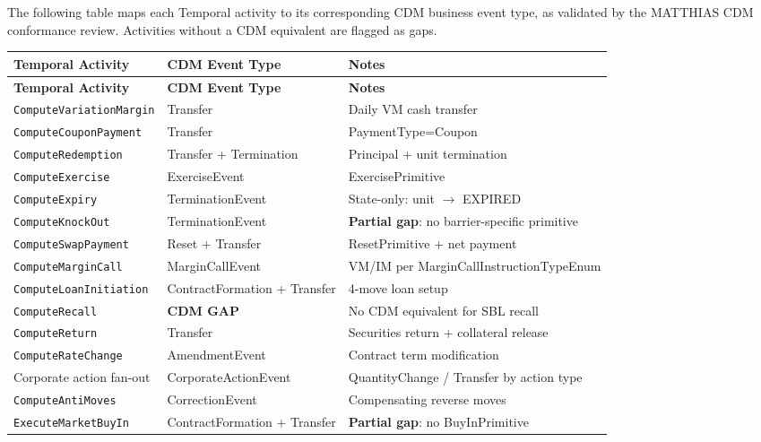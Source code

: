 \documentclass[11pt,a4paper]{article}
\begin{document}
The following table maps each Temporal activity to its corresponding CDM business event type, as validated by the MATTHIAS CDM conformance review. Activities without a CDM equivalent are flagged as gaps.

\begin{center}
\small
\begin{longtable}{p{4.5cm} p{3.5cm} p{5cm}}
\toprule
\textbf{Temporal Activity} & \textbf{CDM Event Type} & \textbf{Notes} \\
\midrule
\endfirsthead
\toprule
\textbf{Temporal Activity} & \textbf{CDM Event Type} & \textbf{Notes} \\
\midrule
\endhead
\texttt{ComputeVariationMargin} & Transfer & Daily VM cash transfer \\
\midrule
\texttt{ComputeCouponPayment} & Transfer & PaymentType=Coupon \\
\midrule
\texttt{ComputeRedemption} & Transfer + Termination & Principal + unit termination \\
\midrule
\texttt{ComputeExercise} & ExerciseEvent & ExercisePrimitive \\
\midrule
\texttt{ComputeExpiry} & TerminationEvent & State-only: unit $\to$ EXPIRED \\
\midrule
\texttt{ComputeKnockOut} & TerminationEvent & \textbf{Partial gap}: no barrier-specific primitive \\
\midrule
\texttt{ComputeSwapPayment} & Reset + Transfer & ResetPrimitive + net payment \\
\midrule
\texttt{ComputeMarginCall} & MarginCallEvent & VM/IM per MarginCallInstructionTypeEnum \\
\midrule
\texttt{ComputeLoanInitiation} & ContractFormation + Transfer & 4-move loan setup \\
\midrule
\texttt{ComputeRecall} & \textbf{CDM GAP} & No CDM equivalent for SBL recall \\
\midrule
\texttt{ComputeReturn} & Transfer & Securities return + collateral release \\
\midrule
\texttt{ComputeRateChange} & AmendmentEvent & Contract term modification \\
\midrule
Corporate action fan-out & CorporateActionEvent & QuantityChange / Transfer by action type \\
\midrule
\texttt{ComputeAntiMoves} & CorrectionEvent & Compensating reverse moves \\
\midrule
\texttt{ExecuteMarketBuyIn} & ContractFormation + Transfer & \textbf{Partial gap}: no BuyInPrimitive \\
\bottomrule
\end{longtable}
\end{center}
\end{document}
